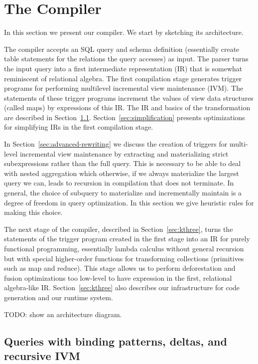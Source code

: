 \section{The Compiler}
\label{sec:compiler}


In this section we present our compiler. We start by sketching its architecture.

The compiler accepts an SQL query and schema definition (essentially create table statements for the relations the query accesses) as input. The parser turns the input query into a first intermediate representation (IR) that is somewhat reminiscent of relational algebra. The first compilation stage generates trigger programs for performing multilevel incremental view maintenance (IVM). The statements of these trigger programs increment the values of view data structures (called maps) by expressions of this IR. The IR and basics of the transformation are described in Section~\ref{sec:compiler_calc}. Section~\ref{sec:simplification} presents optimizations for simplifying IRs in the first compilation stage.

In Section~\ref{sec:advanced-rewriting} we discuss the creation of triggers for multi-level incremental view maintenance by extracting and materializing strict subexpressions rather than the full query. This is necessary to be able to deal with nested aggregation which otherwise, if we always materialize the largest query we can, leads to recursion in compilation that does not terminate. In general, the choice of subquery to materialize and incrementally maintain is a degree of freedom in query optimization. In this section we give heuristic rules for making this choice.

The next stage of the compiler, described in Section~\ref{sec:kthree}, turns the statements of the trigger program created in the first stage into an IR for purely functional programming, essentially lambda calculus without general recursion but with special higher-order functions for transforming collections (primitives such as map and reduce). This stage allows us to perform deforestation and fusion optimizations too low-level to have expression in the first, relational algebra-like IR.
Section~\ref{sec:kthree} also describes our infrastructure for code generation and our runtime system.

TODO: show an architecture diagram.




\subsection{Queries with binding patterns, deltas, and recursive IVM}
\label{sec:compiler_calc}


